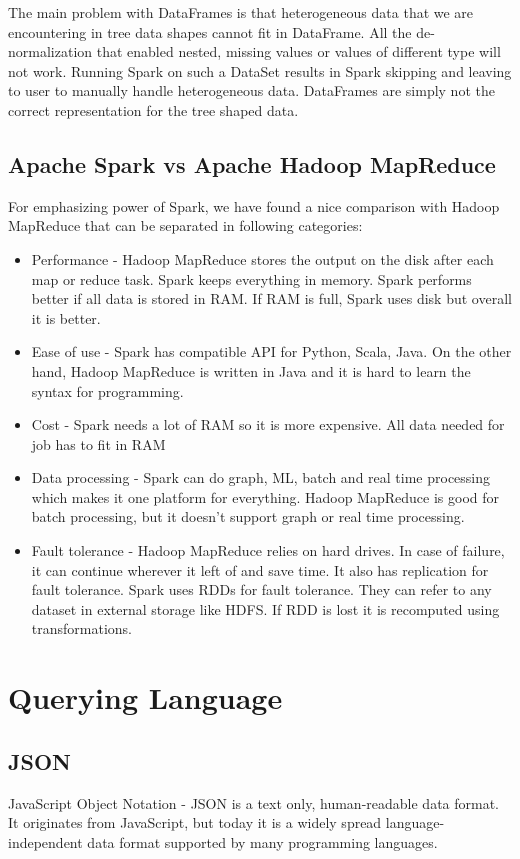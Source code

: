 The main problem with DataFrames is that heterogeneous data that we are encountering in tree data shapes cannot fit in DataFrame. All the de-normalization that enabled nested, missing values or values of different type will not work. Running Spark on such a DataSet results in Spark skipping and leaving to user to manually handle heterogeneous data. DataFrames are simply not the correct representation for the tree shaped data. 

\subsection{Apache Spark vs Apache Hadoop MapReduce}
For emphasizing power of Spark, we have found a nice comparison with Hadoop MapReduce that can be separated in following categories: 
\begin{itemize}
	\item Performance - Hadoop MapReduce stores the output on the disk after each map or reduce task. Spark keeps everything in memory. Spark performs better if all data is stored in RAM. If RAM is full, Spark uses disk but overall it is better.
	\item Ease of use - Spark has compatible API for Python, Scala, Java. On the other hand, Hadoop MapReduce is written in Java and it is hard to learn the syntax for programming. 
	\item Cost - Spark needs a lot of RAM so it is more expensive. All data needed for job has to fit in RAM
	\item Data processing - Spark can do graph, ML, batch and real time processing which makes it one platform for everything. Hadoop MapReduce is good for batch processing, but it doesn't support graph or real time processing. 
	\item Fault tolerance - Hadoop MapReduce relies on hard drives. In case of failure, it can continue wherever it left of and save time. It also has replication for fault tolerance. Spark uses RDDs for fault tolerance. They can refer to any dataset in external storage like HDFS. If RDD is lost it is recomputed using transformations.
\end{itemize}

\section{Querying Language}
\subsection{JSON}
\label{sec:JSON}
JavaScript Object Notation - JSON \cite{JSON}is a text only, human-readable data format. It originates from JavaScript, but today it is a widely spread language-independent data format supported by many programming languages. 

